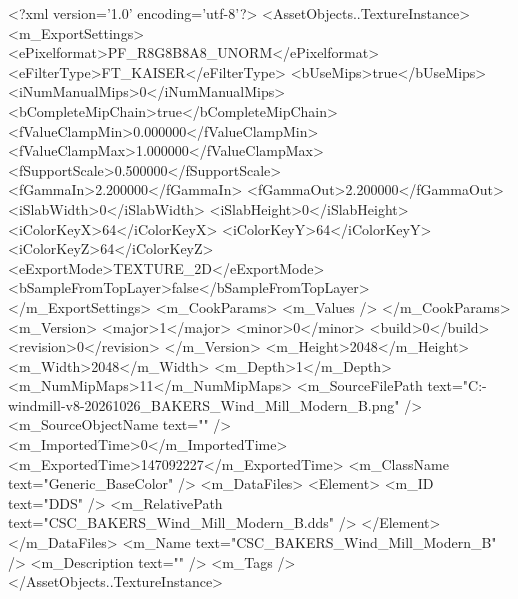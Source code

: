 <?xml version='1.0' encoding='utf-8'?>
<AssetObjects..TextureInstance>
  <m_ExportSettings>
    <ePixelformat>PF_R8G8B8A8_UNORM</ePixelformat>
    <eFilterType>FT_KAISER</eFilterType>
    <bUseMips>true</bUseMips>
    <iNumManualMips>0</iNumManualMips>
    <bCompleteMipChain>true</bCompleteMipChain>
    <fValueClampMin>0.000000</fValueClampMin>
    <fValueClampMax>1.000000</fValueClampMax>
    <fSupportScale>0.500000</fSupportScale>
    <fGammaIn>2.200000</fGammaIn>
    <fGammaOut>2.200000</fGammaOut>
    <iSlabWidth>0</iSlabWidth>
    <iSlabHeight>0</iSlabHeight>
    <iColorKeyX>64</iColorKeyX>
    <iColorKeyY>64</iColorKeyY>
    <iColorKeyZ>64</iColorKeyZ>
    <eExportMode>TEXTURE_2D</eExportMode>
    <bSampleFromTopLayer>false</bSampleFromTopLayer>
  </m_ExportSettings>
  <m_CookParams>
    <m_Values />
  </m_CookParams>
  <m_Version>
    <major>1</major>
    <minor>0</minor>
    <build>0</build>
    <revision>0</revision>
  </m_Version>
  <m_Height>2048</m_Height>
  <m_Width>2048</m_Width>
  <m_Depth>1</m_Depth>
  <m_NumMipMaps>11</m_NumMipMaps>
  <m_SourceFilePath text="C:\Users\Shadow\Desktop\Codex\modern-windmill-v8-20261026\export\textures\CSC_BAKERS_Wind_Mill_Modern_B.png" />
  <m_SourceObjectName text="" />
  <m_ImportedTime>0</m_ImportedTime>
  <m_ExportedTime>147092227</m_ExportedTime>
  <m_ClassName text="Generic_BaseColor" />
  <m_DataFiles>
    <Element>
      <m_ID text="DDS" />
      <m_RelativePath text="CSC_BAKERS_Wind_Mill_Modern_B.dds" />
    </Element>
  </m_DataFiles>
  <m_Name text="CSC_BAKERS_Wind_Mill_Modern_B" />
  <m_Description text="" />
  <m_Tags />
</AssetObjects..TextureInstance>